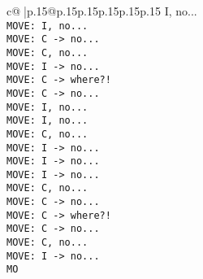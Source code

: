 \documentclass{article}
\begin{document}
{\begin{supertabular}{c@{$\;$}|p{.15\linewidth}@{}p{.15\linewidth}p{.15\linewidth}p{.15\linewidth}p{.15\linewidth}p{.15\linewidth}}
{{{ I, no...\\ \tt  MOVE: I, no...\\ \tt  MOVE: C -> no...\\ \tt  MOVE: C, no...\\ \tt  MOVE: I -> no...\\ \tt  MOVE: C -> where?!\\ \tt  MOVE: C -> no...\\ \tt  MOVE: I, no...\\ \tt  MOVE: I, no...\\ \tt  MOVE: C, no...\\ \tt  MOVE: I -> no...\\ \tt  MOVE: I -> no...\\ \tt  MOVE: I -> no...\\ \tt  MOVE: C, no...\\ \tt  MOVE: C -> no...\\ \tt  MOVE: C -> where?!\\ \tt  MOVE: C -> no...\\ \tt  MOVE: C, no...\\ \tt  MOVE: I -> no...\\ \tt  MO}}}
\end{supertabular}}
\end{document}
